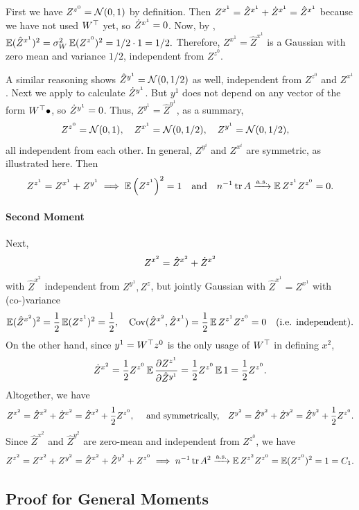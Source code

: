 \documentclass[main.tex]{subfiles}
\begin{document}
First we have $Z^{z^{0}} =\mathcal{N}(0,1)$ by definition.
Then $Z^{x^{1}} = \hat Z^{x^{1}} + \dot Z^{x^{1}} = \hat Z^{x^{1}}$ because we have not used $W^\top$ yet, so $\dot Z^{x^1} = 0$.
Now, by , $\operatorname*{\mathbb{E}} (\hat Z^{x^1})^2 = \sigma_W^2 \operatorname*{\mathbb{E}} (Z^{z^0})^2 = 1/2 \cdot 1 = 1/2.$
Therefore, $Z^{x^1} = \hat Z^{x^{1}}$ is a Gaussian with zero mean and variance $1/2$, independent from $Z^{z^0}$.

A similar reasoning shows $\hat Z^{y^1} = \mathcal{N}(0, 1/2)$ as well, independent from $Z^{z^0}$ and $Z^{x^1}$.
Next we apply  to calculate $\dot Z^{y^1}$.
But $y^1$ does not depend on any vector of the form $W^\top \bullet$, so $\dot Z^{y^1} = 0$.
Thus, $Z^{y^1} = \hat Z^{y^1}$,  as a summary,
\begin{align*}
Z^{z^{0}} & =\mathcal{N}(0,1),\quad
Z^{x^{1}} =\mathcal{N}(0,1/2),\quad
Z^{y^{1}} =\mathcal{N}(0,1/2),
\end{align*}
all independent from each other.
In general, $Z^{y^i}$ and $Z^{x^i}$ are symmetric, as illustrated here.
Then
\[
Z^{z^{1}}=Z^{x^{1}}+Z^{y^{1}}
\implies
\operatorname*{\mathbb{E}}\left(Z^{z^{1}}\right)^{2}=1\quad\text{and}\quad
{n}^{-1} \operatorname{tr} A \xrightarrow{\mathrm{a.s.}} \operatorname*{\mathbb{E}} Z^{z^{1}}Z^{z^{0}}=0.
\]

\paragraph*{Second Moment}

Next,
\[
Z^{x^{2}}=\hat{Z}^{x^{2}}+\dot Z^{x^{2}}
\]
with $\hat{Z}^{x^{2}}$ independent from $Z^{y^1}, Z^z$, but jointly Gaussian with $\hat{Z}^{x^{1}}=Z^{x^{1}}$ with (co-)variance
\[
\operatorname*{\mathbb{E}}(\hat{Z}^{x^{2}})^{2}=\frac{1}{2}\operatorname*{\mathbb{E}}(Z^{z^{1}})^{2}=\frac{1}{2},\quad
\operatorname{Cov}(\hat{Z}^{x^{2}},\hat{Z}^{x^{1}})=\frac{1}{2}\operatorname*{\mathbb{E}} Z^{z^{1}}Z^{z^{0}}=0
\quad\text{(i.e. independent).}
\]
On the other hand, since $y^1 = W^\top z^0$ is the only usage of $W^\top$ in defining $x^2$,
\[
\dot Z^{x^{2}}=\frac{1}{2}Z^{z^{0}}\operatorname*{\mathbb{E}}\frac{\partial Z^{z^{1}}}{\partial \hat Z^{y^{1}}}=\frac{1}{2}Z^{z^{0}}\operatorname*{\mathbb{E}}1=\frac{1}{2}Z^{z^{0}}.
\]
Altogether, we have
\[
Z^{x^{2}}=\hat{Z}^{x^{2}}+\dot Z^{x^{2}}=\hat{Z}^{x^{2}}+\frac{1}{2}Z^{z^{0}},\quad
\text{
and symmetrically,}
\quad
Z^{y^{2}}=\hat{Z}^{y^{2}}+\dot Z^{y^{2}}=\hat{Z}^{y^{2}}+\frac{1}{2}Z^{z^{0}}.
\]
Since $\hat Z^{x^2}$ and $\hat Z^{y^2}$ are zero-mean and independent from $Z^{z^0}$, we have
\[
Z^{z^{2}}=Z^{x^{2}}+Z^{y^{2}}=\hat{Z}^{x^{2}}+\hat{Z}^{y^{2}}+Z^{z^{0}}
\implies
{n}^{-1} \operatorname{tr} A^{2} \xrightarrow{\mathrm{a.s.}} \operatorname*{\mathbb{E}} Z^{z^{2}}Z^{z^{0}} = \operatorname*{\mathbb{E}} (Z^{z^{0}})^2 = 1 =C_{1}.
\]

\subsection{Proof for General Moments}
\label{sec:semicircleProofGeneralK}
\end{document}
